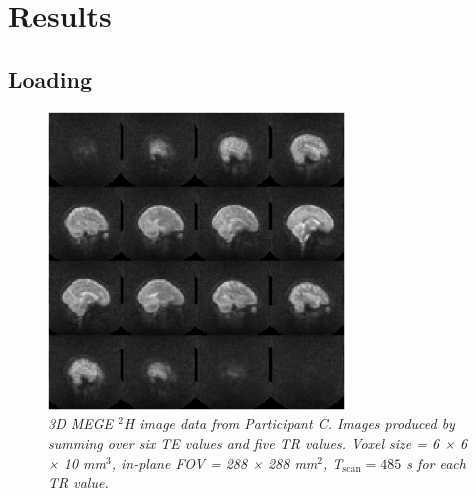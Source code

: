 \section{Results}
\subsection{Loading}

\begin{figure}[H]
    \centering
    \includegraphics[width=0.7\textwidth]{Figures/D2O/Sag_Full.png}
    \caption{\textit{3D MEGE $^2$H image data from Participant C. Images produced by summing over six \ac{TE} values and five \ac{TR} values. Voxel size = 6 × 6 × 10 mm$^3$, in-plane \ac{FOV} = 288 × 288 mm$^2$, T$_\textrm{scan}=485$ s for each \ac{TR} value.}}
    \label{fig:D2O:Sag_Full}
\end{figure}

